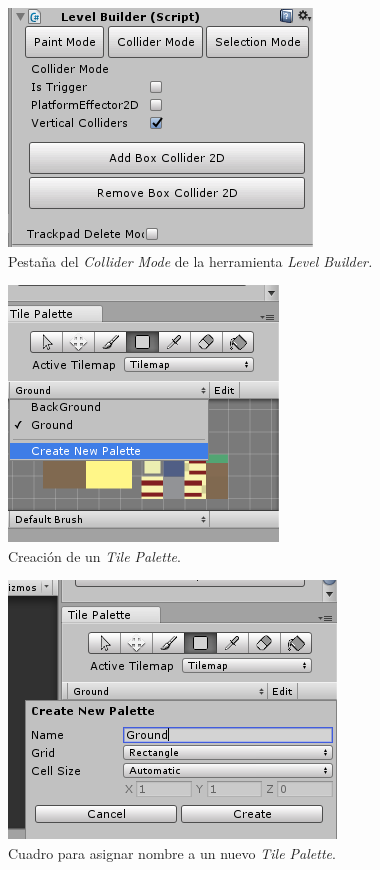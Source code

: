 \begin{figure}[h]
        \centering
        \includegraphics[height=0.2 \textheight]{03TrabajoRealizado/imagenes/levelBuilder03.png}
        \caption{Pestaña del \textit{Collider Mode} de la herramienta
        \textit{Level
        Builder.}}
        \label{fig:LevelBuilder02}
\end{figure}

\begin{figure}[h]
        \centering
        \includegraphics[height=0.2 \textheight]{03TrabajoRealizado/imagenes/createTilemap05.png}
        \caption{Creación de un \textit{Tile Palette}.}
        \label{fig:TileMaps01}
\end{figure}

\begin{figure}[h]
        \centering
        \includegraphics[height=0.2 \textheight]{03TrabajoRealizado/imagenes/createTilemap06.png}
        \caption{Cuadro para asignar nombre a un nuevo \textit{Tile Palette}.}
        \label{fig:TileMaps02}
\end{figure}

